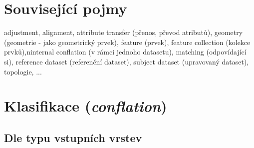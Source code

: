 \section{Související pojmy} %
\label{pojmy}

adjustment, alignment, attribute transfer (přenos, převod atributů), geometry
(geometrie - jako geometrický prvek), feature (prvek), feature collection 
(kolekce prvků),ninternal conflation (v rámci jednoho datasetu), matching 
(odpovídající si), reference dataset (referenční dataset), subject dataset 
(upravovaný dataset), topologie, ... 


\section{Klasifikace (\textit{conflation})}
\label{klasifikace}

\subsection{Dle typu vstupních vrstev}
\label{dle-vstupu}

